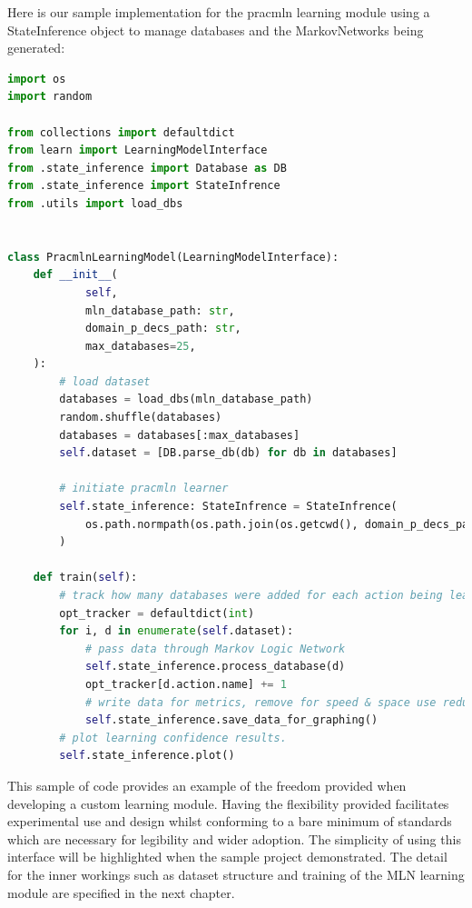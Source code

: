 Here is our sample implementation for the pracmln learning module using a StateInference object to manage databases and the MarkovNetworks being generated:
\begin{lstlisting}[language=Python]
import os
import random

from collections import defaultdict
from learn import LearningModelInterface
from .state_inference import Database as DB
from .state_inference import StateInfrence
from .utils import load_dbs


class PracmlnLearningModel(LearningModelInterface):
    def __init__(
            self,
            mln_database_path: str,
            domain_p_decs_path: str,
            max_databases=25,
    ):
        # load dataset
        databases = load_dbs(mln_database_path)
        random.shuffle(databases)
        databases = databases[:max_databases]
        self.dataset = [DB.parse_db(db) for db in databases]

        # initiate pracmln learner
        self.state_inference: StateInfrence = StateInfrence(
            os.path.normpath(os.path.join(os.getcwd(), domain_p_decs_path))
        )

    def train(self):
        # track how many databases were added for each action being learnt
        opt_tracker = defaultdict(int)
        for i, d in enumerate(self.dataset):
            # pass data through Markov Logic Network
            self.state_inference.process_database(d)
            opt_tracker[d.action.name] += 1
            # write data for metrics, remove for speed & space use reduction
            self.state_inference.save_data_for_graphing()
        # plot learning confidence results.
        self.state_inference.plot()
\end{lstlisting}
This sample of code provides an example of the freedom provided when developing a custom learning module.
Having the flexibility provided facilitates experimental use and design whilst conforming to a bare minimum of standards which are necessary for legibility and wider adoption.
The simplicity of using this interface will be highlighted when the sample project demonstrated.
The detail for the inner workings such as dataset structure and training of the MLN learning module are specified in the next chapter.

\newpage
